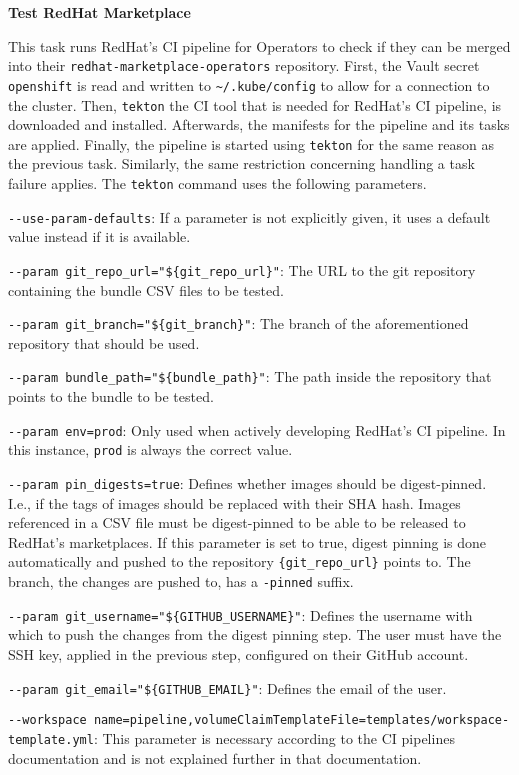 \textbf{Test RedHat Marketplace}

This task runs RedHat's CI pipeline for Operators to check if they can be merged into their \verb|redhat-marketplace-operators| repository.
First, the Vault secret \verb|openshift| is read and written to \verb|~/.kube/config| to allow for a connection to the cluster.
Then, \verb|tekton| the CI tool that is needed for RedHat's CI pipeline, is downloaded and installed.
Afterwards, the manifests for the pipeline and its tasks are applied.
Finally, the pipeline is started using \verb|tekton| for the same reason as the previous task.
Similarly, the same restriction concerning handling a task failure applies.
The \verb|tekton| command uses the following parameters.

\verb|--use-param-defaults|: If a parameter is not explicitly given, it uses a default value instead if it is available.

\verb|--param git_repo_url="${git_repo_url}"|: The URL to the git repository containing the bundle CSV files to be tested.

\verb|--param git_branch="${git_branch}"|: The branch of the aforementioned repository that should be used.

\verb|--param bundle_path="${bundle_path}"|: The path inside the repository that points to the bundle to be tested.

\verb|--param env=prod|: Only used when actively developing RedHat's CI pipeline.
In this instance, \verb|prod| is always the correct value.

\verb|--param pin_digests=true|: Defines whether images should be digest-pinned.
I.e., if the tags of images should be replaced with their SHA hash.
Images referenced in a CSV file must be digest-pinned to be able to be released to RedHat's marketplaces.
If this parameter is set to true, digest pinning is done automatically and pushed to the repository \verb|{git_repo_url}| points to.
The branch, the changes are pushed to, has a \verb|-pinned| suffix.

\verb|--param git_username="${GITHUB_USERNAME}"|: Defines the username with which to push the changes from the digest pinning step.
The user must have the SSH key, applied in the previous step, configured on their GitHub account.

\verb|--param git_email="${GITHUB_EMAIL}"|: Defines the email of the user.

\verb|--workspace name=pipeline,volumeClaimTemplateFile=templates/workspace-template.yml|: This parameter is necessary according to the CI pipelines documentation and is not explained further in that documentation.

